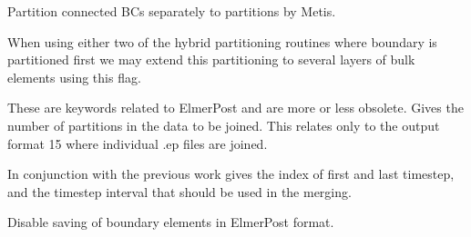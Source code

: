 Partition connected BCs separately to partitions by Metis.

When using either two of the hybrid partitioning routines where boundary is partitioned first we may extend this
partitioning to several layers of bulk elements using this flag. 
\sifend


These are keywords related to ElmerPost and are more or less obsolete. 
\sifbegin
{}
Gives the number of partitions in the data to be joined. This relates only to the output format 
15 where individual .ep files are joined. 

In conjunction with the previous work gives the index of first and last timestep, and the
timestep interval that should be used in the merging. 

Disable saving of boundary elements in ElmerPost format.
\sifend



